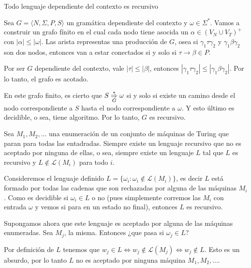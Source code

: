 \begin{teorema}\label{teorema:recursividad}
  Todo lenguaje dependiente del contexto es recursivo
\end{teorema}

\begin{demo}[0.8\textwidth]
  Sea \(G=\langle N, \Sigma, P, S \rangle\) un gramática dependiente del contexto y \(\omega\in\Sigma^*\). Vamos a construir un grafo fínito en el cual cada nodo tiene asocida un \(\alpha\in(V_N\cup V_T)^+\) con \(|\alpha| \leq |\omega|\). Las arista representas una producción de \(G\), osea si \(\gamma_1\tau\gamma_2\) y \(\gamma_1\beta\gamma_2\) son dos nodos, entonces van a estar conectados si y solo si \(\tau\to\beta\in P\).

  Por ser \(G\) dependiente del contexto, vale \(|\tau|\leq |\beta|\), entonces \(|\gamma_1\tau\gamma_2|\leq |\gamma_1\beta\gamma_2|\). Por lo tanto, el grafo es acotado.

  En este grafo finito, es cierto que \(S\underset{G}{\overset{*}{\Rightarrow}}\omega\) si y solo si existe un camino desde el nodo correspondiente a \(S\) hasta el nodo correspondiente a \(\omega\). Y esto último es decidible, o sea, tiene algoritmo. Por lo tanto, \(G\) es recursivo.
\end{demo}

\begin{lemma}
  Sea \(M_1, M_2, \dots\) una enumeración de un conjunto de máquinas de Turing que paran para todas las entadradas. Siempre existe un lenguaje recursivo que no es aceptado por ninguna de ellas, o sea, siempre existe un lenguaje \(L\) tal que \(L\) es recursivo y \(L\notin\mathcal{L}(M_i)\) para todo \(i\).
\end{lemma}

\begin{demo}[0.8\textwidth]
  Consideremos el lenguaje definido \( L = \{ \omega_i : \omega_i \notin \mathcal{L}(M_i)\}\), es decir \(L\) está formado por todas las cadenas que son rechazadas por alguna de las máquinas \(M_i\). Como es decidible si \(\omega_i\in L\) o no (pues simplemente corremos las \(M_i\) con entrada \(\omega\) y vemos si para en un estado no final), entonces \(L\) es recursivo.

  Supongamos ahora que este lenguaje es aceptado por alguna de las máquinas enumeradas. Sea \(M_j\), la misma. Entonces ¿que pasa si \(\omega_j\in L\)?

  Por definición de \(L\) tenemos que \(w_j\in L \iff w_j\notin \mathcal{L}(M_j) \iff w_j \notin L\). Esto es un absurdo, por lo tanto \(L\) no es aceptado por ninguna máquina \(M_1,M_2,\dots\).
\end{demo}

